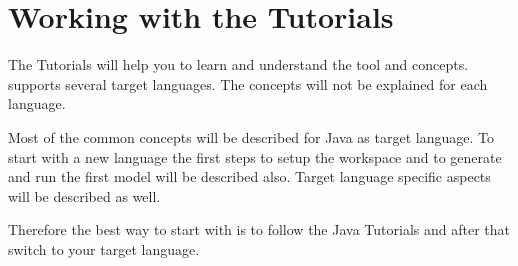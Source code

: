 \chapter{Working with the \eTrice{} Tutorials}

The \eTrice{} Tutorials will help you to learn and understand the \eTrice{} tool and concepts. \eTrice{} supports 
several target languages. The concepts will not be explained for each language. 

Most of the common concepts will be described for Java as target language. To start with a new language the 
first steps to setup the workspace and to generate and run the first model will be described also. Target 
language specific aspects will be described as well.

Therefore the best way to start with \eTrice{} is to follow the Java Tutorials and after that switch to your 
target language.  

